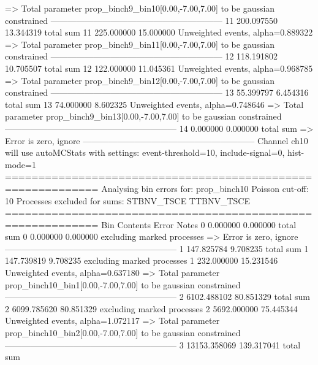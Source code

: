   => Total parameter prop_binch9_bin10[0.00,-7.00,7.00] to be gaussian constrained
------------------------------------------------------------
11         200.097550      13.344319       total sum                     
11         225.000000      15.000000       Unweighted events, alpha=0.889322
  => Total parameter prop_binch9_bin11[0.00,-7.00,7.00] to be gaussian constrained
------------------------------------------------------------
12         118.191802      10.705507       total sum                     
12         122.000000      11.045361       Unweighted events, alpha=0.968785
  => Total parameter prop_binch9_bin12[0.00,-7.00,7.00] to be gaussian constrained
------------------------------------------------------------
13         55.399797       6.454316        total sum                     
13         74.000000       8.602325        Unweighted events, alpha=0.748646
  => Total parameter prop_binch9_bin13[0.00,-7.00,7.00] to be gaussian constrained
------------------------------------------------------------
14         0.000000        0.000000        total sum                     
  => Error is zero, ignore      
------------------------------------------------------------
Channel ch10 will use autoMCStats with settings: event-threshold=10, include-signal=0, hist-mode=1
============================================================
Analysing bin errors for: prop_binch10
Poisson cut-off: 10
Processes excluded for sums: STBNV_TSCE TTBNV_TSCE
============================================================
Bin        Contents        Error           Notes                         
0          0.000000        0.000000        total sum                     
0          0.000000        0.000000        excluding marked processes    
  => Error is zero, ignore      
------------------------------------------------------------
1          147.825784      9.708235        total sum                     
1          147.739819      9.708235        excluding marked processes    
1          232.000000      15.231546       Unweighted events, alpha=0.637180
  => Total parameter prop_binch10_bin1[0.00,-7.00,7.00] to be gaussian constrained
------------------------------------------------------------
2          6102.488102     80.851329       total sum                     
2          6099.785620     80.851329       excluding marked processes    
2          5692.000000     75.445344       Unweighted events, alpha=1.072117
  => Total parameter prop_binch10_bin2[0.00,-7.00,7.00] to be gaussian constrained
------------------------------------------------------------
3          13153.358069    139.317041      total sum                     
